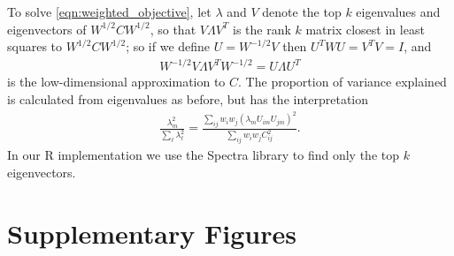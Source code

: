 \documentclass[11pt, oneside]{article}   	%
\newif\ifsubmission
\newcommand\citep{\cite}
\begin{document}
To solve \eqref{eqn:weighted_objective},
let $\lambda$ and $V$ denote the top $k$ eigenvalues and eigenvectors of $W^{1/2} C W^{1/2}$,
so that $V \Lambda V^T$ is the rank $k$ matrix closest in least squares to $W^{1/2} C W^{1/2}$;
so if we define $U = W^{-1/2} V$
then $U^T W U = V^T V = I$,
and 
\begin{align*}
    W^{-1/2} V \Lambda V^T W^{-1/2} 
    =
    U \Lambda U^T
\end{align*}
is the low-dimensional approximation to $C$.
The proportion of variance explained is calculated from eigenvalues as before,
but has the interpretation
\begin{align*}
    \frac{ \lambda_m^2 }{ \sum_\ell \lambda_\ell^2 } 
    = 
    \frac{ \sum_{ij} w_i w_j ( \lambda_m U_{im} U_{jm} )^2 }{ \sum_{ij} w_i w_j C_{ij}^2 } .
\end{align*}
In our R implementation we use the Spectra library \citep{qiu2016rspectra}
to find only the top $k$ eigenvectors.

\ifsubmission
    \listoffigures
    \clearpage
\fi

\section{Supplementary Figures}
\end{document}
